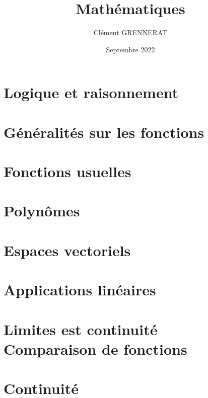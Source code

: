 \documentclass[13pt, twoside, a4paper, french]{report}
\newcommand*{\getSubject}{Mathématiques}
\begin{document}
    \title{\getSubject}
    \author{Clément GRENNERAT}
    \date{Septembre 2022}
    \pagestyle{non-chapter-style}


    \chapter{Logique et raisonnement}\label{ch:logique-et-raisonnement}
    


    \chapter{Généralités sur les fonctions}\label{ch:generalites-sur-les-fonctions}
    


    \chapter{Fonctions usuelles}\label{ch:fonctions-usuelles}
    


    \chapter{Polynômes}\label{ch:polynomes}
    


    \chapter{Espaces vectoriels}\label{ch:espaces-vectoriels}
    


    \chapter{Applications linéaires}\label{ch:applications-lineaires}
    


    \chapter{Limites est continuité\\Comparaison de fonctions}\label{ch:limites-est-continuite---comparaison-de-fonctions}
    

    \chapter{Continuité}\label{ch:continuite}
    
\end{document}
